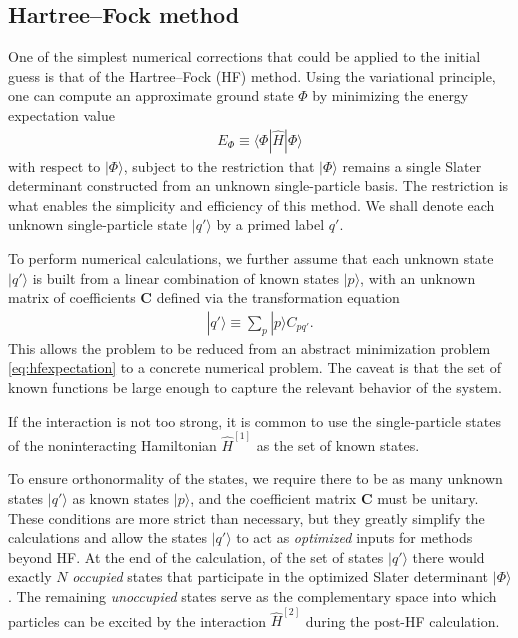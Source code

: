 \subsection{Hartree--Fock method}
\label{subsec:HartreeFockmethod}

One of the simplest numerical corrections that could be applied to the initial guess is that of the Hartree--Fock (HF) method.  Using the variational principle, one can compute an approximate ground state $\Phi$ by minimizing the energy expectation value
\begin{align} \label{eq:hfexpectation}
  E_{\Phi} \equiv \langle \Phi | \hat H | \Phi \rangle
\end{align}
with respect to $|\Phi\rangle$, subject to the restriction that $|\Phi\rangle$ remains a single Slater determinant constructed from an unknown single-particle basis.  The restriction is what enables the simplicity and efficiency of this method.  We shall denote each unknown single-particle state $|q'\rangle$ by a primed label $q'$.

To perform numerical calculations, we further assume that each unknown state $|q'\rangle$ is built from a linear combination of known states $|p\rangle$, with an unknown matrix of coefficients $\bm C$ defined via the transformation equation
\begin{align*}
  |q'\rangle \equiv \sum_p |p\rangle C_{p q'}.
\end{align*}
This allows the problem to be reduced from an abstract minimization problem \eqref{eq:hfexpectation} to a concrete numerical problem.  The caveat is that the set of known functions be large enough to capture the relevant behavior of the system.

If the interaction is not too strong, it is common to use the single-particle states of the noninteracting Hamiltonian $\hat{H}^{[1]}$ as the set of known states.

To ensure orthonormality of the states, we require there to be as many unknown states $|q'\rangle$ as known states $|p\rangle$, and the coefficient matrix $\bm C$ must be unitary.  These conditions are more strict than necessary, but they greatly simplify the calculations and allow the states $|q'\rangle$ to act as \textit{optimized} inputs for methods beyond HF.  At the end of the calculation, of the set of states $|q'\rangle$ there would exactly $N$ \textit{occupied} states that participate in the optimized Slater determinant $|\Phi\rangle$.  The remaining \textit{unoccupied} states serve as the complementary space into which particles can be excited by the interaction $\hat{H}^{[2]}$ during the post-HF calculation.

